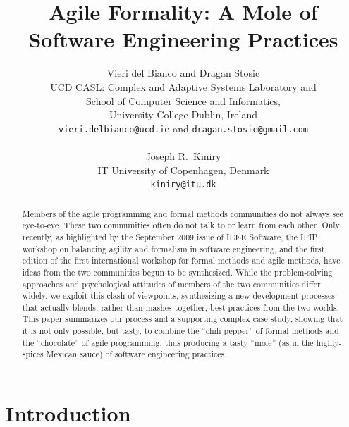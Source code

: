 \documentclass[english]{lni}
\begin{document}
\title{Agile Formality: A Mole of Software Engineering Practices}

\author{Vieri del Bianco and Dragan Stosic\\
  UCD CASL: Complex and Adaptive Systems Laboratory and\\
  School of Computer Science and Informatics,\\
  University College Dublin, Ireland\\
  \texttt{vieri.delbianco@ucd.ie} and \texttt{dragan.stosic@gmail.com}\\
  \\
  Joseph R.~Kiniry \\
  IT University of Copenhagen, Denmark\\
  \texttt{kiniry@itu.dk}
}

\maketitle

\begin{abstract}

  Members of the agile programming and formal methods communities do
  not always see eye-to-eye.  These two communities often do not talk
  to or learn from each other.  Only recently, as highlighted by the
  September 2009 issue of IEEE Software, the IFIP workshop on
  balancing agility and formalism in software engineering, and the
  first edition of the first international workshop for formal methods
  and agile methods, have ideas from the two communities begun to be
  synthesized.  While the problem-solving approaches and psychological
  attitudes of members of the two communities differ widely, we
  exploit this clash of viewpoints, synthesizing a new development
  processes that actually blends, rather than mashes together, best
  practices from the two worlds.  This paper summarizes our process
  and a supporting complex case study, showing that it is not only
  possible, but tasty, to combine the ``chili pepper'' of formal
  methods and the ``chocolate'' of agile programming, thus producing a
  tasty ``mole'' (as in the highly-spices Mexican sauce) of software
  engineering practices.

\end{abstract}

\section{Introduction}
\label{sec:introduction}
\end{document}
